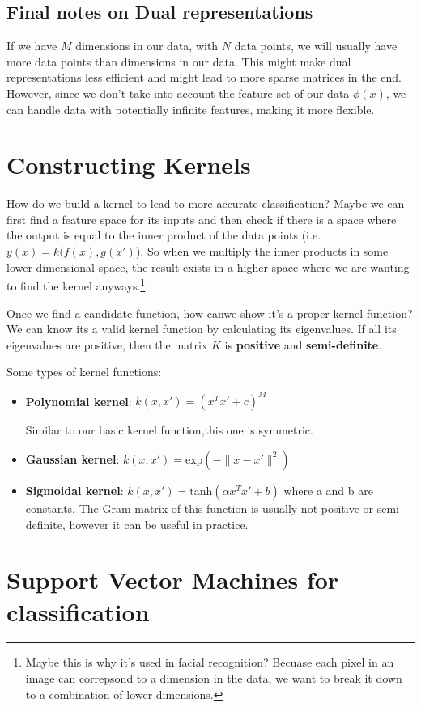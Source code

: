 \documentclass{tufte-handout}
\begin{document}
	\subsection{Final notes on Dual representations}
	If we have $M$ dimensions in our data, with $N$ data points, we will usually have 
	more data points than dimensions in our data. This might make dual representations
	less efficient and might lead to more sparse matrices in the end. However, since
	we don't take into account the feature set of our data $\phi(x)$, we can handle 
	data with potentially infinite features, making it more flexible.
\section{Constructing Kernels}
	How do we build a kernel to lead to more accurate classification? Maybe we can first find
	a feature space for its inputs and then check if there is a space where the output is equal to 
	the inner product of the data points (i.e. $y(x) = k(f(x), g(x')$). 
	So when we multiply the inner products in some lower dimensional space, the result exists in a 
	higher space where we are wanting to find the kernel anyways.\footnote{Maybe this is why it's used
	in facial recognition? Becuase each pixel in an image can correpsond to a dimension in the data,
	we want to break it down to a combination of lower dimensions.}

	Once we find a candidate function, how canwe show it's a proper kernel function? We can know its 
	a valid kernel function by calculating its eigenvalues. If all its eigenvalues are positive,
	then the matrix $K$ is \textbf{positive} and \textbf{semi-definite}.
	
	Some types of kernel functions: 
	\begin{itemize}
		\item \textbf{Polynomial kernel}: $k(x, x') = (x^{T}x' + c)^{M}$
				
				Similar to our basic kernel function,this one is symmetric.
		\item \textbf{Gaussian kernel}: $k(x, x') = \textrm{exp}(-\|x - x'\|^{2})$
		\item \textbf{Sigmoidal kernel}: $k(x, x') = \textrm{tanh}(\alpha x^{T}x' + b)$
				where a and b are constants. The Gram matrix of this function is usually not
				positive or semi-definite, however it can be useful in practice.
	\end{itemize}

\section{Support Vector Machines for classification}
\end{document}
